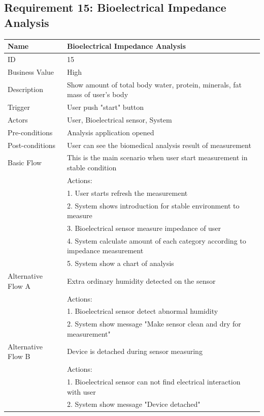 \documentclass{article}
\begin{document}
		\subsection{Requirement 15: Bioelectrical Impedance Analysis}
		\begin{table}[htbp]
			\centering
			\small
			\begin{tabularx}{\textwidth}{|>{\raggedright\arraybackslash}p{}|X|}
				\hline
				Name             & Bioelectrical Impedance Analysis                                \\ \hline
				ID               & 15                                                                                       \\ \hline
				Business Value   & High                                                                                    \\ \hline
				Description      & Show amount of total body water, protein, minerals, fat mass of user's body \\ \hline
				Trigger          & User push "start" button \\ \hline
				Actors           & User, Bioelectrical sensor, System                                \\ \hline
				Pre-conditions   & Analysis application opened                                  \\ \hline
				Post-conditions  & User can see the biomedical analysis result of measurement                                              \\ \hline
				Basic Flow       & This is the main scenario when user start measurement in stable condition \\ \hline
								 & Actions: \\
								 & 1. User starts refresh the measurement \\
								 & 2. System shows introduction for stable environment to measure \\
								 & 3. Bioelectrical sensor measure impedance of user \\
								 & 4. System calculate amount of each category according to impedance measurement \\
								 & 5. System show a chart of analysis \\ \hline
				Alternative Flow A & Extra ordinary humidity detected on the sensor \\
								 & Actions: \\
								 & 1. Bioelectrical sensor detect abnormal humidity \\
								 & 2. System show message "Make sensor clean and dry for measurement" \\ \hline
				Alternative Flow B & Device is detached during sensor measuring \\
								 & Actions: \\
								 & 1. Bioelectrical sensor can not find electrical interaction with user  \\
								 & 2. System show message "Device detached" \\ \hline
			\end{tabularx}
		\end{table}
\end{document}
